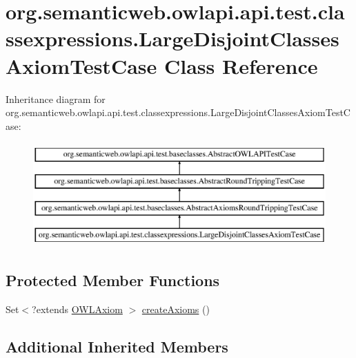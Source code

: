 \hypertarget{classorg_1_1semanticweb_1_1owlapi_1_1api_1_1test_1_1classexpressions_1_1_large_disjoint_classes_axiom_test_case}{\section{org.\-semanticweb.\-owlapi.\-api.\-test.\-classexpressions.\-Large\-Disjoint\-Classes\-Axiom\-Test\-Case Class Reference}
\label{classorg_1_1semanticweb_1_1owlapi_1_1api_1_1test_1_1classexpressions_1_1_large_disjoint_classes_axiom_test_case}
}
Inheritance diagram for org.\-semanticweb.\-owlapi.\-api.\-test.\-classexpressions.\-Large\-Disjoint\-Classes\-Axiom\-Test\-Case\-:\begin{figure}[H]
\begin{center}
\leavevmode
\includegraphics[height=4.000000cm]{classorg_1_1semanticweb_1_1owlapi_1_1api_1_1test_1_1classexpressions_1_1_large_disjoint_classes_axiom_test_case}
\end{center}
\end{figure}
\subsection*{Protected Member Functions}
\begin{DoxyCompactItemize}
\item 
Set$<$?extends \hyperlink{interfaceorg_1_1semanticweb_1_1owlapi_1_1model_1_1_o_w_l_axiom}{O\-W\-L\-Axiom} $>$ \hyperlink{classorg_1_1semanticweb_1_1owlapi_1_1api_1_1test_1_1classexpressions_1_1_large_disjoint_classes_axiom_test_case_a3156e879e32a571b015e763d90fa3afb}{create\-Axioms} ()
\end{DoxyCompactItemize}
\subsection*{Additional Inherited Members}


